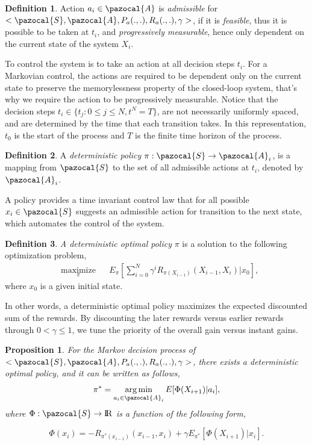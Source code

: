\documentclass[12pt]{aastex62}
\newtheorem{prop}{Proposition}
\theoremstyle{definition}
\newtheorem{defn}{Definition}
\DeclareMathOperator*{\argmin}{arg\,min}
\begin{document}
\begin{defn}
Action $a_{i} \in \pazocal{A}$ is \textit{admissible} for $<\pazocal{S},\pazocal{A}, P_a(.,.), R_a(.,.), \gamma>$, if it is \textit{feasible}, thus it is possible to be taken at $t_i$, and \textit{progressively measurable}, hence only dependent on the current state of the system $X_i$.
\end{defn}
To control the system is to take an action at all decision steps $t_i$. For a Markovian control, the actions are required to be dependent only on the current state to preserve the memorylessness property of the closed-loop system, that's why we require the action to be progressively measurable. Notice that the decision steps $t_i \in \{ t_j: 0 \leq j \leq N, t^N  =T\}$, are not necessarily uniformly spaced, and are determined by the time that each transition takes. In this representation, $t_0$ is the start of the process and $T$ is the finite time horizon of the process.

\begin{defn}
A \textit{deterministic policy} $\pi : \pazocal{S} \rightarrow \pazocal{A}_i$, is a mapping from $\pazocal{S}$ to the set of all admissible actions at $t_i$, denoted by $\pazocal{A}_i$. 
\end{defn}
A policy provides a time invariant control law that for all possible $x_i \in \pazocal{S}$ suggests an admissible action for transition to the next state, which automates the control of the system.
\begin{defn}
\textit{A deterministic optimal policy} $\pi$ is a solution to the following optimization problem,
\begin{equation}\label{equ_opt1}
\begin{aligned}
& \underset{\pi}{\text{maximize}}
& & E_{\pi}[\sum_{i = 0}^N \gamma^i R_{\pi(X_{i-1})}(X_{i-1}, X_{i}) | x_0],
\end{aligned}
\end{equation}
where $x_0$ is a given initial state.
\end{defn}
In other words, a deterministic optimal policy maximizes the expected discounted sum of the rewards. By discounting the later rewards versus earlier rewards through $0 < \gamma \leq 1$, we tune the priority of the overall gain versus instant gains.
\begin{prop} \label{prop_main}
For the Markov decision process of $<\pazocal{S},\pazocal{A}, P_a(.,.), R_a(.,.), \gamma>$, there exists a deterministic optimal policy, and it can be written as follows, 
\begin{equation}\label{equ_opt_pol}
\pi^*= \argmin_{a_{i} \in \pazocal{A}_i} E[\Phi(X_{{i+1}}) | a_{i}],
\end{equation}
where $\Phi: \pazocal{S} \rightarrow \rm I\!R$ is a function of the following form,

\begin{equation}\label{equ_phi_compatible}
\Phi(x_{i}) =  - R_{\pi^*(x_{i-1})}(x_{i-1},x_i)  + \gamma E_{\pi^*}[\Phi(X_{{i+1}})|x_i].
\end{equation}
\end{prop}
\end{document}
